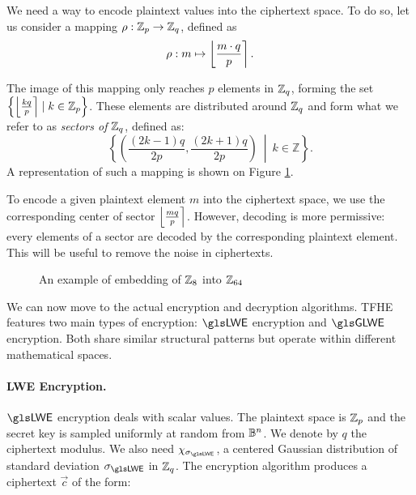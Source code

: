 We need a way to encode plaintext values into the ciphertext space. To do so, let us consider a mapping $\rho: \mathbb{Z}_p \rightarrow \mathbb{Z}_q$, defined as \[
\rho: m  \mapsto \left \lfloor \frac{m \cdot q} {p} \right \rceil.
\]


The image of this mapping only reaches $p$ elements in $\mathbb{Z}_q$, forming the set $\left \{ \left \lfloor \frac {k q}{p} \right \rceil \mid k \in \mathbb{Z}_p \right \}$. These elements are distributed around $\mathbb{Z}_q$ and form what we refer to as \emph{sectors of $\mathbb{Z}_q$}, defined as: \[
\left\{ \left( \frac{(2k - 1)q}{2p}, \frac{(2k + 1)q}{2p} \right) ~\middle|~ k \in \mathbb{Z} \right\}.
\] A representation of such a mapping is shown on Figure \ref{fig:example_encoding}.

To encode a given plaintext element $m$ into the ciphertext space, we use the corresponding center of sector $\left \lfloor \frac{mq}{p} \right \rceil$. However, decoding is more permissive: every elements of a sector are decoded by the corresponding plaintext element. This will be useful to remove the noise in ciphertexts.

\begin{figure}[htbp]
	\centering
	\caption{An example of embedding of $\mathbb{Z}_8$ into $\mathbb{Z}_{64}$}
	\label{fig:example_encoding}
\end{figure}

We can now move to the actual encryption and decryption algorithms. \gls{TFHE} features two main types of encryption: $\LWE$ encryption and $\GLWE$ encryption. Both share similar structural patterns but operate within different mathematical spaces.

\paragraph{LWE Encryption.}
$\LWE$ encryption deals with scalar values. The plaintext space is $\mathbb{Z}_p$ and the secret key is sampled uniformly at random from $\mathbb{B}^n$. We denote by $q$ the ciphertext modulus. We also need 
$\chi_{\lweSigma}$, a centered Gaussian distribution of standard deviation $\lweSigma$ in $\mathbb{Z}_q$. The encryption algorithm produces a ciphertext $\vec c$ of the form:

